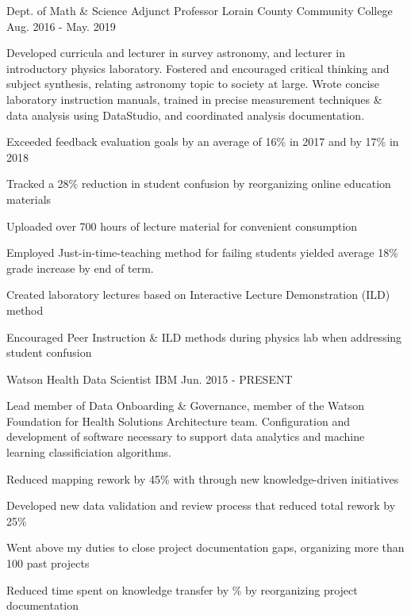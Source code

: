 \begin{cventries}
  \cventry
    {Dept. of Math \& Science} %
    {Adjunct Professor} %
    {Lorain County Community College} %
    {Aug. 2016 - May. 2019} %
    {
      \begin{cvparagraph}
        Developed curricula and lecturer in survey astronomy, and lecturer in introductory physics laboratory.  Fostered and encouraged critical thinking and subject synthesis, relating astronomy topic to society at large.  Wrote concise laboratory instruction manuals, trained in precise measurement techniques \& data analysis using DataStudio, and coordinated analysis documentation.
      \end{cvparagraph}
      \begin{cvitems} %
        \item {Exceeded feedback evaluation goals by an average of 16\% in 2017 and by 17\% in 2018}
        \item {Tracked a 28\% reduction in student confusion by reorganizing online education materials}
        \item {Uploaded over 700 hours of lecture material for convenient consumption}
        \item {Employed Just-in-time-teaching method for failing students yielded average 18\% grade increase by end of term.}
        \item {Created laboratory lectures based on Interactive Lecture Demonstration (ILD) method}
        \item {Encouraged Peer Instruction \& ILD methods during physics lab when addressing student confusion}
      \end{cvitems}
    }

  \cventry
    {Watson Health} %
    {Data Scientist} %
    {IBM} %
    {Jun. 2015 - PRESENT} %
    {
      \begin{cvparagraph}
        Lead member of Data Onboarding \& Governance, member of the Watson Foundation for Health Solutions Architecture team.  Configuration and development of software necessary to support data analytics and machine learning classificiation algorithms.
      \end{cvparagraph}
      \begin{cvitems} %
        \item {Reduced mapping rework by 45\% with through new knowledge-driven initiatives}
        \item {Developed new data validation and review process that reduced total rework by 25\%}
        \item {Went above my duties to close project documentation gaps, organizing more than 100 past projects}
        \item {Reduced time spent on knowledge transfer by \% by reorganizing project documentation}
      \end{cvitems}
    }


\end{cventries}
